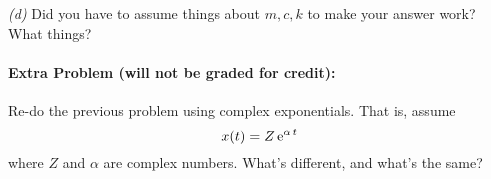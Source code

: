 \documentclass[12pt]{article}
\begin{document}
\textsl{(d)} Did you have to assume things about $m, c, k$ to make
your answer work? What things?

\paragraph{Extra Problem (will not be graded for credit):}%
Re-do the previous problem using complex exponentials. That is, assume
\begin{equation}
x(t) = Z\,\mathrm{e}^{\alpha\,t}
\end{equation}
where $Z$ and $\alpha$ are complex numbers. What's different, and
what's the same?
\end{document}
